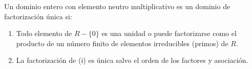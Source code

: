 \begin{definicion}
    Un dominio entero con elemento neutro multiplicativo es un dominio de factorización única si:
    \begin{enumerate}
        \item Todo elemento de $R-\{0\}$ es una unidad o puede factorizarse como el producto de un número finito de elementos irreducibles (primos) de $R$. 
        \item La factorización de (i) es única salvo el orden de los factores y asociación. 
    \end{enumerate}
\end{definicion}